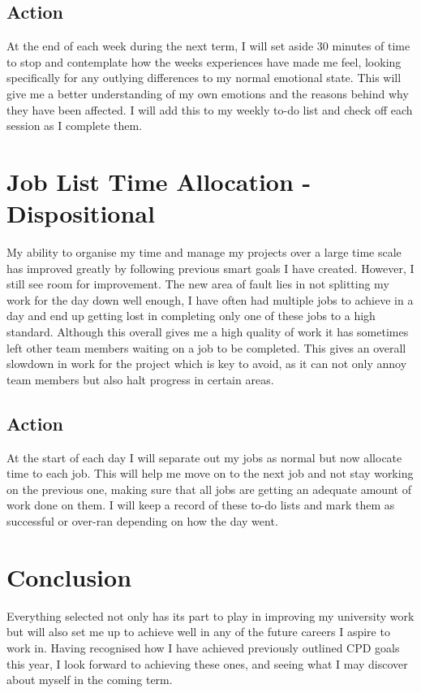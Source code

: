\documentclass{scrartcl}
\begin{document}
\subsection{Action}
At the end of each week during the next term, I will set aside 30 minutes of time to stop and contemplate how the weeks experiences have made me feel, looking specifically for any outlying differences to my normal emotional state. This will give me a better understanding of my own emotions and the reasons behind why they have been affected. I will add this to my weekly to-do list and check off each session as I complete them.

\section{Job List Time Allocation - Dispositional}
My ability to organise my time and manage my projects over a large time scale has improved greatly by following previous smart goals I have created. However, I still see room for improvement. The new area of fault lies in not splitting my work for the day down well enough, I have often had multiple jobs to achieve in a day and end up getting lost in completing only one of these jobs to a high standard. Although this overall gives me a high quality of work it has sometimes left other team members waiting on a job to be completed. This gives an overall slowdown in work for the project which is key to avoid, as it can not only annoy team members but also halt progress in certain areas.
\subsection{Action}
At the start of each day I will separate out my jobs as normal but now allocate time to each job. This will help me move on to the next job and not stay working on the previous one, making sure that all jobs are getting an adequate amount of work done on them. I will keep a record of these to-do lists and mark them as successful or over-ran depending on how the day went.

\section{Conclusion}
Everything selected not only has its part to play in improving my university work but will also set me up to achieve well in any of the future careers I aspire to work in. Having recognised how I have achieved previously outlined CPD goals this year, I look forward to achieving these ones, and seeing what I may discover about myself in the coming term. 

	
	
\end{document}
